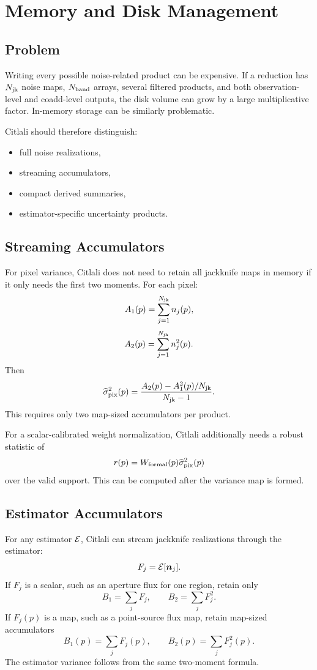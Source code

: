 \documentclass[11pt]{article}
\newcommand{\noise}{\boldsymbol{n}}
\begin{document}
\section{Memory and Disk Management}

\subsection{Problem}

Writing every possible noise-related product can be expensive. If a reduction
has \(N_{\rm jk}\) noise maps, \(N_{\rm band}\) arrays, several filtered
products, and both observation-level and coadd-level outputs, the disk volume
can grow by a large multiplicative factor. In-memory storage can be similarly
problematic.

Citlali should therefore distinguish:

\begin{itemize}[leftmargin=1.5em]
\item full noise realizations,
\item streaming accumulators,
\item compact derived summaries,
\item estimator-specific uncertainty products.
\end{itemize}

\subsection{Streaming Accumulators}

For pixel variance, Citlali does not need to retain all jackknife maps in memory
if it only needs the first two moments. For each pixel:
\[
  A_1(p) = \sum_{j=1}^{N_{\rm jk}} n_j(p),
\]
\[
  A_2(p) = \sum_{j=1}^{N_{\rm jk}} n_j^2(p).
\]
Then
\[
  \widehat{\sigma}^2_{\rm pix}(p)
    =
    \frac{
      A_2(p) - A_1^2(p)/N_{\rm jk}
    }{
      N_{\rm jk}-1
    }.
\]
This requires only two map-sized accumulators per product.

For a scalar-calibrated weight normalization, Citlali additionally needs a
robust statistic of
\[
  r(p)=W_{\rm formal}(p)\widehat{\sigma}^2_{\rm pix}(p)
\]
over the valid support. This can be computed after the variance map is formed.

\subsection{Estimator Accumulators}

For any estimator \({\cal E}\), Citlali can stream jackknife realizations
through the estimator:
\[
  F_j = {\cal E}[\noise_j].
\]
If \(F_j\) is a scalar, such as an aperture flux for one region, retain only
\[
  B_1 = \sum_j F_j,
  \qquad
  B_2 = \sum_j F_j^2.
\]
If \(F_j(p)\) is a map, such as a point-source flux map, retain map-sized
accumulators
\[
  B_1(p) = \sum_j F_j(p),
  \qquad
  B_2(p) = \sum_j F_j^2(p).
\]
The estimator variance follows from the same two-moment formula.
\end{document}
